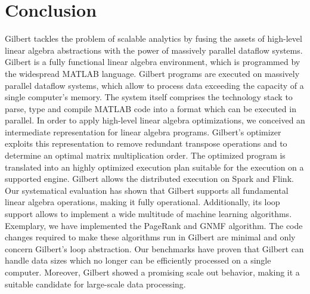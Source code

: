 \section{Conclusion}
\label{sec:conclusion}

Gilbert tackles the problem of scalable analytics by fusing the assets of high-level linear algebra abstractions with the power of massively parallel dataflow systems. Gilbert is a fully functional linear algebra environment, which is programmed by the widespread MATLAB language. Gilbert programs are executed on massively parallel dataflow systems, which allow to process data exceeding the capacity of a single computer's memory. The system itself comprises the technology stack to parse, type and compile MATLAB code into a format which can be executed in parallel. In order to apply high-level linear algebra optimizations, we conceived an intermediate representation for linear algebra programs. Gilbert's optimizer exploits this representation to remove redundant transpose operations and to determine an optimal matrix multiplication order. The optimized program is translated into an highly optimized execution plan suitable for the execution on a supported engine. Gilbert allows the distributed execution on Spark and Flink. Our systematical evaluation has shown that Gilbert supports all fundamental linear algebra operations, making it fully operational.
Additionally, its loop support allows to implement a wide multitude of machine learning algorithms.
Exemplary, we have implemented the PageRank and GNMF algorithm.
The code changes required to make these algorithms run in Gilbert are minimal and only concern Gilbert's loop abstraction.
Our benchmarks have proven that Gilbert can handle data sizes which no longer can be efficiently processed on a single computer.
Moreover, Gilbert showed a promising scale out behavior, making it a suitable candidate for large-scale data processing.

